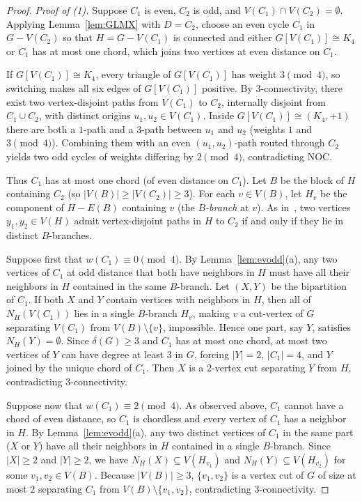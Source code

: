 \documentclass[10pt,letterpaper]{article}
\theoremstyle{zetaplain}
\theoremstyle{zetadef}
\theoremstyle{remark}
\numberwithin{equation}{section}
\begin{document}
\begin{proof}
\emph{Proof of (1).} Suppose $C_1$ is even, $C_2$ is odd, and $V(C_1) \cap V(C_2) = \emptyset$. Applying Lemma~\ref{lem:GLMX} with $D = C_2$, choose an even cycle $C_1$ in $G - V(C_2)$ so that $H = G - V(C_1)$ is connected and either $G[V(C_1)] \cong K_4$ or $C_1$ has at most one chord, which joins two vertices at even distance on $C_1$.

If $G[V(C_1)] \cong K_4$, every triangle of $G[V(C_1)]$ has weight $3 \pmod 4$, so switching makes all six edges of $G[V(C_1)]$ positive. By $3$-connectivity, there exist two vertex-disjoint paths from $V(C_1)$ to $C_2$, internally disjoint from $C_1 \cup C_2$, with distinct origins $u_1, u_2 \in V(C_1)$. Inside $G[V(C_1)] \cong (K_4, +1)$ there are both a $1$-path and a $3$-path between $u_1$ and $u_2$ (weights $1$ and $3 \pmod 4$). Combining them with an even $(u_1, u_2)$-path routed through $C_2$ yields two odd cycles of weights differing by $2 \pmod 4$, contradicting NOC.

Thus $C_1$ has at most one chord (of even distance on $C_1$). Let $B$ be the block of $H$ containing $C_2$ (so $|V(B)| \ge |V(C_2)| \ge 3$). For each $v \in V(B)$, let $H_v$ be the component of $H - E(B)$ containing $v$ (the \emph{$B$-branch} at $v$). As in~\cite[Lemma~5.3]{BGLP26}, two vertices $y_1, y_2 \in V(H)$ admit vertex-disjoint paths in $H$ to $C_2$ if and only if they lie in distinct $B$-branches.

Suppose first that $w(C_1) \equiv 0 \pmod 4$. By Lemma~\ref{lem:evodd}(a), any two vertices of $C_1$ at odd distance that both have neighbors in $H$ must have all their neighbors in $H$ contained in the same $B$-branch. Let $(X, Y)$ be the bipartition of $C_1$. If both $X$ and $Y$ contain vertices with neighbors in $H$, then all of $N_H(V(C_1))$ lies in a single $B$-branch $H_v$, making $v$ a cut-vertex of $G$ separating $V(C_1)$ from $V(B) \setminus \{v\}$, impossible. Hence one part, say $Y$, satisfies $N_H(Y) = \emptyset$. Since $\delta(G) \ge 3$ and $C_1$ has at most one chord, at most two vertices of $Y$ can have degree at least $3$ in $G$, forcing $|Y| = 2$, $|C_1| = 4$, and $Y$ joined by the unique chord of $C_1$. Then $X$ is a $2$-vertex cut separating $Y$ from $H$, contradicting $3$-connectivity.

Suppose now that $w(C_1) \equiv 2 \pmod 4$. As observed above, $C_1$ cannot have a chord of even distance, so $C_1$ is chordless and every vertex of $C_1$ has a neighbor in $H$. By Lemma~\ref{lem:evodd}(a), any two distinct vertices of $C_1$ in the same part ($X$ or $Y$) have all their neighbors in $H$ contained in a single $B$-branch. Since $|X| \ge 2$ and $|Y| \ge 2$, we have $N_H(X) \subseteq V(H_{v_1})$ and $N_H(Y) \subseteq V(H_{v_2})$ for some $v_1, v_2 \in V(B)$. Because $|V(B)| \ge 3$, $\{v_1, v_2\}$ is a vertex cut of $G$ of size at most $2$ separating $C_1$ from $V(B) \setminus \{v_1, v_2\}$, contradicting $3$-connectivity.


\end{proof}
\end{document}
